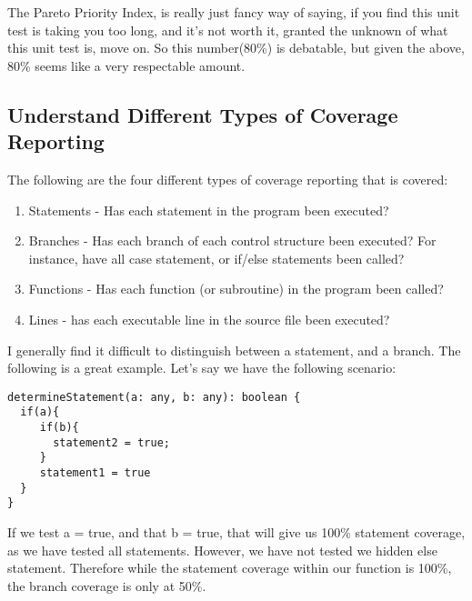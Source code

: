 The Pareto Priority Index, is really just fancy way of saying, if you find this
unit test is taking you too long, and it's not worth it, granted the unknown
of what this unit test is, move on. So this number(80\%) is debatable, but given
the above, 80\% seems like a very respectable amount.

\subsection{ Understand Different Types of Coverage Reporting }
The following are the four different types of coverage reporting that is
covered:
\begin{enumerate}
  \item Statements - Has each statement in the program been executed?
  \item Branches - Has each branch of each control structure been executed? For
  instance, have all case statement, or if/else statements been called?
  \item Functions - Has each function (or subroutine) in the program been called?
  \item Lines - has each executable line in the source file been executed?
\end{enumerate}

I generally find it difficult to distinguish between a statement, and a
branch. The following is a great example. Let's say we have the following
scenario:
\begin{verbatim}
determineStatement(a: any, b: any): boolean {
  if(a){
     if(b){
       statement2 = true;
     }
     statement1 = true
  }
}
\end{verbatim}

If we test a = true, and that b = true, that will give us 100\% statement
coverage, as we have tested all statements. However, we have not tested we
hidden else statement. Therefore while the statement coverage within our function
is 100\%, the branch coverage is only at 50\%.
